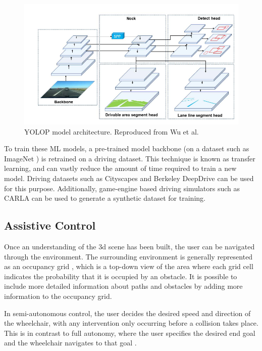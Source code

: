 \begin{figure}[H]
    \centering
    \includegraphics[width=0.7\linewidth]{images/yolop.png}
    \caption{YOLOP model architecture. Reproduced from Wu et al. \cite{wuYOLOPYouOnly2021}}
    \label{fig:yolop}
\end{figure}

To train these ML models, a pre-trained model backbone (on a dataset such as ImageNet \cite{jiadengImageNetLargescaleHierarchical2009})
is retrained on a driving dataset. This technique is known as transfer learning, and can vastly reduce the amount of time required
to train a new model.
Driving datasets such as Cityscapes \cite{cordtsCityscapesDatasetSemantic2016} and Berkeley DeepDrive \cite{yuBDD100KDiverseDriving2018}
can be used for this purpose. Additionally, game-engine based driving simulators such as CARLA \cite{dosovitskiyCARLAOpenUrban2017} can be used to generate a
synthetic dataset for training.



\pagebreak
\subsection{Assistive Control}
Once an understanding of the 3d scene has been built, the user can be navigated through the environment.
The surrounding environment is generally represented as an occupancy grid \cite{elfesUsingOccupancyGrids1989},
which is a top-down view of the area where each grid cell indicates the probability that it is occupied
by an obstacle. It is possible to include more detailed information about
paths and obstacles by adding more information to the occupancy grid.

In semi-autonomous control, the user decides the desired speed and direction of the wheelchair, with any intervention only
occurring before a collision takes place. This is in contrast to full autonomy, where the user specifies the
desired end goal and the wheelchair navigates to that goal \cite{wangS2P2SelfSupervisedGoalDirected2021}.

